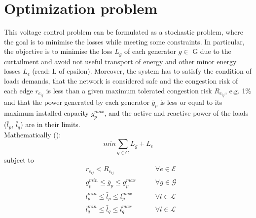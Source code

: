 \section{Optimization problem}
This voltage control problem can be formulated as a stochastic problem, where the goal is to minimise the losses while meeting some constraints. In particular, the objective is to minimise the loss $L_g$ of each generator $g \in$ \gls{G} due to the curtailment and avoid not useful transport of energy and other minor energy losses $L_{\epsilon}$ (read: L of epsilon). Moreover, the system has to satisfy the condition of loads demands, that the network is considered safe and the congestion risk of each edge $r_{e_{ij}}$ is less than a given maximum tolerated congestion risk $R_{e_{ij}}$, e.g. {1\%} and that the power generated by each generator $\bar{g}_p$ is less or equal to its maximum installed capacity $g^{max}_p$, and the active and reactive power of the loads ($\bar{l}_p$, $\bar{l}_q$) are in their limits. \\
Mathematically (\cite{haulogypaper}):
\[
min \sum_{g \in G} L_g + L_{\epsilon}
\]
subject to
\begin{equation*}
\begin{aligned}
& r_{e_{ij}} < R_{e_{ij}} \qquad & \forall e \in \mathcal{E} \\
& g^{min}_p \leq \bar{g}_p \leq g^{max}_p \qquad & \forall g \in \mathcal{G} \\
& l^{min}_p \leq \bar{l}_p \leq l^{max}_p \qquad & \forall l \in \mathcal{L} \\
& l^{min}_q \leq \bar{l}_q \leq l^{max}_q \qquad & \forall l \in \mathcal{L} \\
\end{aligned}
\end{equation*}

